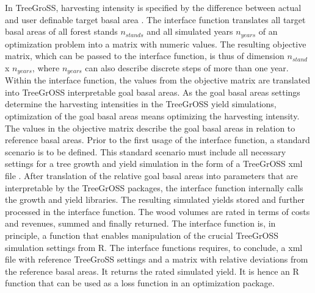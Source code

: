 In TreeGroSS, harvesting intensity is specified by the difference between actual and user definable target basal area \citep[p. 149-150]{hansen_2014}. The interface function translates all target basal areas of all forest stands $n_{stands}$ and all simulated years $n_{years}$ of an optimization problem into a matrix with numeric values. The resulting objective matrix, which can be passed to the interface function, is thus of dimension $n_{stand}$ x $n_{years}$, where $n_{years}$ can also describe discrete steps of more than one year. Within the interface function, the values from the objective matrix are translated into TreeGrOSS interpretable goal basal areas. As the goal basal areas settings determine the harvesting intensities in the TreeGrOSS yield simulations, optimization of the goal basal areas means optimizing the harvesting intensity. The values in the objective matrix describe the goal basal areas in relation to reference basal areas. Prior to the first usage of the interface function, a standard scenario is to be defined. This standard scenario must include all necessary settings for a tree growth and yield simulation in the form of a TreeGrOSS xml file \citep[p. 30]{hansen_2014}. After translation of the relative goal basal areas into parameters that are interpretable by the TreeGrOSS packages, the interface function internally calls the growth and yield libraries. The resulting simulated yields stored and further processed in the interface function. The wood volumes are rated in terms of costs and revenues, summed and finally returned. The interface function is, in principle, a function that enables manipulation of the crucial TreeGrOSS simulation settings from R. The interface functions requires, to conclude, a xml file with reference TreeGroSS settings and a matrix with relative deviations from the reference basal areas. It returns the rated simulated yield. It is hence an R function that can be used as a loss function in an optimization package.

